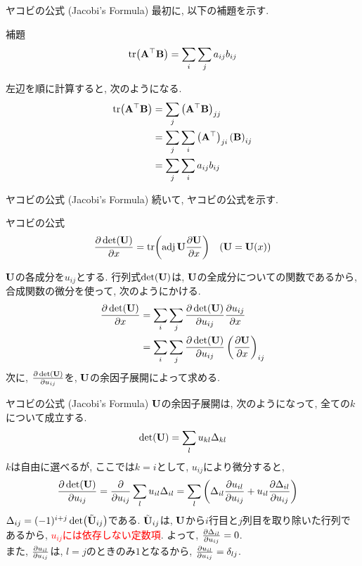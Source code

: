 \documentclass[dvipdfmx,notheorems,t]{beamer}
\begin{document}
\begin{frame}{ヤコビの公式 (Jacobi's Formula)}
最初に, 以下の補題を示す.
\begin{block}{補題}
  \begin{align*}
    \tr(\vb{A}^\top \vb{B}) = \sum_i \sum_j a_{ij} b_{ij}
  \end{align*}
\end{block}

左辺を順に計算すると, 次のようになる.
\begin{align*}
  \tr(\vb{A}^\top \vb{B}) &= \sum_j \left( \vb{A}^\top \vb{B} \right)_{jj} \\
    &= \sum_j \sum_i \left( \vb{A}^\top \right)_{ji} \left( \vb{B} \right)_{ij} \\
    &= \sum_j \sum_i a_{ij} b_{ij}
\end{align*}
\end{frame}

\begin{frame}{ヤコビの公式 (Jacobi's Formula)}
続いて, ヤコビの公式を示す.
\begin{block}{ヤコビの公式}
  \begin{align*}
    \pdv{\det(\vb{U})}{x} &= \tr(\operatorname{adj} \vb{U} \pdv{\vb{U}}{x})
    & \text{($\vb{U} = \vb{U}(x)$)}
  \end{align*}
\end{block}

$\vb{U}$の各成分を$u_{ij}$とする.
行列式$\det(\vb{U})$は, $\vb{U}$の全成分についての関数であるから,
合成関数の微分を使って, 次のようにかける.
\begin{align*}
  \pdv{\det(\vb{U})}{x} &= \sum_i \sum_j \pdv{\det(\vb{U})}{u_{ij}} \pdv{u_{ij}}{x} \\
    &= \sum_i \sum_j \pdv{\det(\vb{U})}{u_{ij}} \left( \pdv{\vb{U}}{x} \right)_{ij}
\end{align*}
次に, $\pdv{\det(\vb{U})}{u_{ij}}$を, $\vb{U}$の余因子展開によって求める.
\end{frame}

\begin{frame}{ヤコビの公式 (Jacobi's Formula)}
$\vb{U}$の余因子展開は, 次のようになって, 全ての$k$について成立する.
\begin{align*}
  \det(\vb{U}) = \sum_l u_{kl} \Delta_{kl}
\end{align*}
$k$は自由に選べるが, ここでは$k = i$として, $u_{ij}$により微分すると,
\begin{align*}
  \pdv{\det(\vb{U})}{u_{ij}} &= \pdv{u_{ij}} \sum_l u_{il} \Delta_{il}
    = \sum_l \left( \Delta_{il} \pdv{u_{il}}{u_{ij}} + u_{il} \pdv{\Delta_{il}}{u_{ij}} \right)
\end{align*}
$\Delta_{ij} = (-1)^{i + j} \det(\tilde{\vb{U}}_{ij})$である.
$\tilde{\vb{U}}_{ij}$は, $\vb{U}$から$i$行目と$j$列目を取り除いた行列であるから,
\textcolor{red}{$u_{ij}$には依存しない定数項}.
よって, $\pdv{\Delta_{il}}{u_{ij}} = 0$. \\
また, $\pdv{u_{il}}{u_{ij}}$は, $l = j$のときのみ$1$となるから, $\pdv{u_{il}}{u_{ij}} = \delta_{lj}$.
\end{frame}
\end{document}
